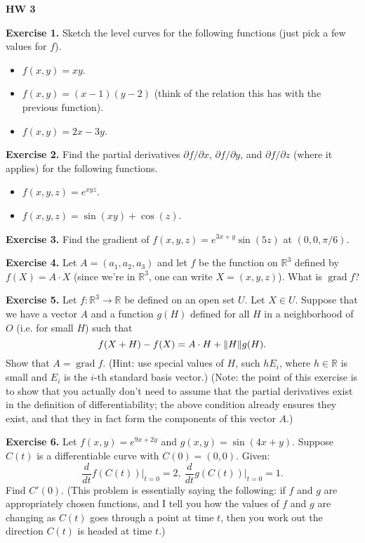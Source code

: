 \documentclass{article}
\DeclareMathOperator{\grd}{grad}
\begin{document}

\textbf{HW 3}

\textbf{Exercise 1.}
Sketch the level curves for the following functions (just pick a few values for $f$).
\begin{itemize}
    \item $f(x,y)=xy$.
    \item $f(x,y)=(x-1)(y-2)$ (think of the relation this has with the previous function).
    \item $f(x,y)=2x-3y$.
\end{itemize}

\textbf{Exercise 2.} Find the partial derivatives $\partial f / \partial x$, $\partial f/ \partial y$,
and $\partial f / \partial z$ (where it applies) for the following functions.
\begin{itemize}
    \item $f(x,y,z) = e^{xyz}$.
    \item $f(x,y,z) = \sin(xy) + \cos(z)$.
\end{itemize}

\textbf{Exercise 3.} Find the gradient of $f(x,y,z) = e^{3x+y} \sin(5z)$ at $(0,0,\pi/6)$.

\textbf{Exercise 4.} Let $A=(a_1,a_2,a_3)$ and let $f$ be the function on $\mathbb{R}^3$ defined by
$f(X) = A\cdot X$ (since we're in $\mathbb{R}^3$, one can write $X=(x,y,z)$). What is $\grd f$?

\textbf{Exercise 5.} Let $f:\mathbb{R}^3 \to \mathbb{R}$ be defined on an open set $U$. Let $X \in U$. Suppose that we have
a vector $A$ and a function $g(H)$ defined for all $H$ in a neighborhood of $O$ (i.e. for small $H$)
such that
\[f(X+H) - f(X) = A \cdot H + \norm{H}g(H).\]
Show that $A = \grd f$. (Hint: use special values of $H$, such $hE_i$, where $h\in \mathbb{R}$ is small and 
$E_i$ is the $i$-th standard basis vector.) (Note: the point of this exercise is to show that you actually don't need
to assume that the partial derivatives exist in the definition of differentiability; the above
condition already ensures they exist, and that they in fact form the components of this vector $A$.)

\textbf{Exercise 6.} 
Let $f(x,y) = e^{9x+2y}$ and $g(x,y) = \sin(4x+y)$. Suppose $C(t)$ is a differentiable curve with
$C(0)=(0,0)$. Given:
\[\frac{d}{dt} f(C(t)) \bigg\vert_{t=0}=2,\ \frac{d}{dt} g(C(t)) \bigg\vert_{t=0}=1.\]
Find $C'(0)$.
(This problem is essentially saying the following: if $f$ and $g$ are appropriately chosen functions,
and I tell you how the values of $f$ and $g$ are changing as $C(t)$ goes through a point at time $t$,
then you work out the direction $C(t)$ is headed at time $t$.)
\end{document}
